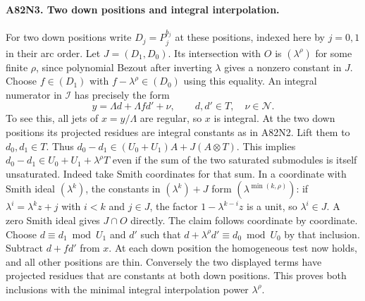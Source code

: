 \paragraph{A82N3. Two down positions and integral interpolation.}
For two down positions write $D_j=P_j^{b_j}$ at these positions,
indexed here by $j=0,1$ in their arc order. Let $J=(D_1,D_0)$.
Its intersection with $O$ is $(\lambda^\rho)$ for some finite
$\rho$, since polynomial Bezout after inverting $\lambda$ gives
a nonzero constant in $J$. Choose $f\in(D_1)$ with
$f-\lambda^\rho\in(D_0)$ using this equality.
An integral numerator in $\mathcal I$ has precisely the form
\[
              y=\Lambda d+\Lambda f d'+\nu,
              \qquad d,d'\in T,\quad\nu\in\mathcal N .
\]
To see this, all jets of $x=y/\Lambda$ are regular, so $x$
is integral. At the two down positions its projected residues
are integral constants as in A82N2. Lift them to $d_0,d_1\in T$.
Thus $d_0-d_1\in(U_0+U_1)A+J(A\otimes T)$. This implies
$d_0-d_1\in U_0+U_1+\lambda^\rho T$ even if the sum of the
two saturated submodules is itself unsaturated. Indeed take
Smith coordinates for that sum. In a coordinate with Smith
ideal $(\lambda^k)$, the constants in $(\lambda^k)+J$ form
$(\lambda^{\min(k,\rho)})$: if $\lambda^i=\lambda^k z+j$
with $i<k$ and $j\in J$, the factor $1-\lambda^{k-i}z$ is a
unit, so $\lambda^i\in J$. A zero Smith ideal gives $J\cap O$
directly. The claim follows coordinate by coordinate.
Choose $d\equiv d_1\bmod U_1$ and $d'$ such that
$d+\lambda^\rho d'\equiv d_0\bmod U_0$ by that inclusion.
Subtract $d+fd'$ from $x$. At each down position the homogeneous
test now holds, and all other positions are thin. Conversely the
two displayed terms have projected residues that are constants
at both down positions. This proves both inclusions with the
minimal integral interpolation power $\lambda^\rho$.

